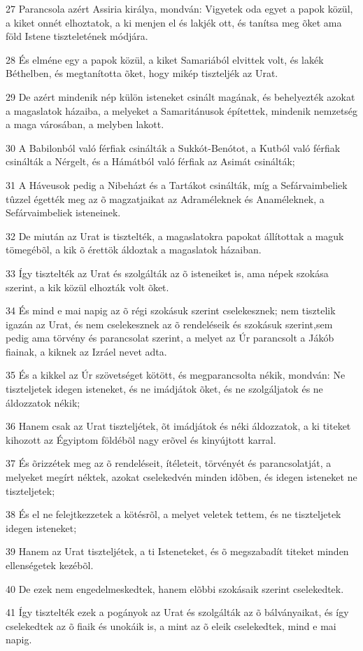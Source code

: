 \par 27 Parancsola azért Assiria királya, mondván: Vigyetek oda egyet a papok közül, a kiket onnét elhoztatok, a ki menjen el és lakjék ott, és tanítsa meg õket ama föld Istene tiszteletének módjára.
\par 28 És elméne egy a papok közül, a kiket Samariából elvittek volt, és lakék Béthelben, és megtanította õket, hogy mikép tiszteljék az Urat.
\par 29 De azért mindenik nép külön isteneket csinált magának, és behelyezték azokat a magaslatok házaiba, a melyeket a Samaritánusok építettek, mindenik nemzetség a maga városában, a melyben lakott.
\par 30 A Babilonból való férfiak csinálták a Sukkót-Benótot, a Kutból való férfiak csinálták a Nérgelt, és a Hámátból való férfiak az Asimát csinálták;
\par 31 A Háveusok pedig a Nibeházt és a Tartákot csinálták, míg a Sefárvaimbeliek tûzzel égették meg az õ magzatjaikat az Adraméleknek és Anaméleknek, a Sefárvaimbeliek isteneinek.
\par 32 De miután az Urat is tisztelték, a magaslatokra papokat állítottak a maguk tömegébõl, a kik õ érettök áldoztak a magaslatok házaiban.
\par 33 Így tisztelték az Urat és szolgálták az õ isteneiket is, ama népek szokása szerint, a kik közül elhozták volt õket.
\par 34 És mind e mai napig az õ régi szokásuk szerint cselekesznek; nem tisztelik igazán az Urat, és nem cselekesznek az õ rendeléseik és szokásuk szerint,sem pedig ama törvény és parancsolat szerint, a melyet az Úr parancsolt a Jákób fiainak, a kiknek az Izráel nevet adta.
\par 35 És a kikkel az Úr szövetséget kötött, és megparancsolta nékik, mondván: Ne tiszteljetek idegen isteneket, és ne imádjátok õket, és ne szolgáljatok és ne áldozzatok nékik;
\par 36 Hanem csak az Urat tiszteljétek, õt imádjátok és néki áldozzatok, a ki titeket kihozott az Égyiptom földébõl nagy erõvel és kinyújtott karral.
\par 37 És õrizzétek meg az õ rendeléseit, ítéleteit, törvényét és parancsolatját, a melyeket megírt néktek, azokat cselekedvén minden idõben, és idegen isteneket ne tiszteljetek;
\par 38 És el ne felejtkezzetek a kötésrõl, a melyet veletek tettem, és ne tiszteljetek idegen isteneket;
\par 39 Hanem az Urat tiszteljétek, a ti Isteneteket, és õ megszabadít titeket minden ellenségetek kezébõl.
\par 40 De ezek nem engedelmeskedtek, hanem elõbbi szokásaik szerint cselekedtek.
\par 41 Így tisztelték ezek a pogányok az Urat és szolgálták az õ bálványaikat, és így cselekedtek az õ fiaik és unokáik is, a mint az õ eleik cselekedtek, mind e mai napig.

